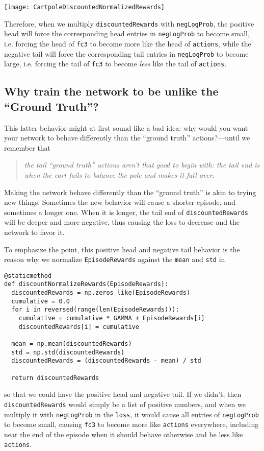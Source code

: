 \documentclass[10pt]{article}
\theoremstyle{plain}
\theoremstyle{definition}
\theoremstyle{remark}
\newcommand{\0}{\varnothing}
\newcommand{\<}{\langle}
\renewcommand{\>}{\rangle}
\begin{document}
\centerline{\texttt{[image: CartpoleDiscountedNormalizedRewards]}}

Therefore, when we multiply \lstinline{discountedRewards} with \lstinline{negLogProb}, the positive head will force the corresponding head entries in \lstinline{negLogProb} to become small, i.e. forcing the head of \lstinline{fc3} to become more like the head of \lstinline{actions}, while the negative tail will force the corresponding tail entries in \lstinline{negLogProb} to become large, i.e. forcing the tail of \lstinline{fc3} to become \emph{less} like the tail of \lstinline{actions}.

\subsection{Why train the network to be unlike the ``Ground Truth''?}

This latter behavior might at first sound like a bad idea: why would you want your network to behave differently than the ``ground truth'' actions?---until we remember that

\large
\begin{quote}
\emph{the tail ``ground truth'' actions aren't that good to begin with: the tail end is when the cart fails to balance the pole and makes it fall over.}
\end{quote}
\normalsize
Making the network behave differently than the ``ground truth'' is akin to trying new things. Sometimes the new behavior will cause a shorter episode, and sometimes a longer one. When it is longer, the tail end of \lstinline{discountedRewards} will be deeper and more negative, thus causing the loss to decrease and the network to favor it.

To emphasize the point, this positive head and negative tail behavior is the reason why we normalize \lstinline{EpisodeRewards} against the \lstinline{mean} and \lstinline{std} in

\footnotesize
\begin{lstlisting}
@staticmethod
def discountNormalizeRewards(EpisodeRewards):
  discountedRewards = np.zeros_like(EpisodeRewards)
  cumulative = 0.0
  for i in reversed(range(len(EpisodeRewards))):
    cumulative = cumulative * GAMMA + EpisodeRewards[i]
    discountedRewards[i] = cumulative

  mean = np.mean(discountedRewards)
  std = np.std(discountedRewards)
  discountedRewards = (discountedRewards - mean) / std

  return discountedRewards
\end{lstlisting}
\normalsize
so that we could have the positive head and negative tail. If we didn't, then \lstinline{discountedRewards} would simply be a list of positive numbers, and when we multiply it with \lstinline{negLogProb} in the \lstinline{loss}, it would cause all entries of \lstinline{negLogProb} to become small, causing \lstinline{fc3} to become more like \lstinline{actions} everywhere, including near the end of the episode when it should behave otherwise and be less like \lstinline{actions}.
\end{document}
